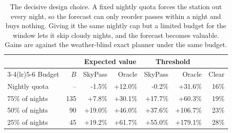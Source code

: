 \begin{table}[t]
\caption{The decisive design choice. A fixed nightly quota forces the station out every night, so the forecast can only reorder passes within a night and buys nothing. Giving it the same nightly cap but a limited budget for the window lets it skip cloudy nights, and the forecast becomes valuable. Gains are against the weather-blind exact planner under the same budget.}
\label{tab:budgetmodes}
\centering
\begin{tabular}{lrrrrrr}
\toprule
& & \multicolumn{2}{c}{Expected value} & \multicolumn{2}{c}{Threshold} & \\
\cmidrule(lr){3-4}\cmidrule(lr){5-6}
Budget & $B$ & SkyPass & Oracle & SkyPass & Oracle & Clear \\
\midrule
Nightly quota & -- & -1.5\% & +12.0\% & -0.2\% & +31.6\% & 16\% \\
75\% of nights & 135 & +7.8\% & +30.1\% & +17.7\% & +60.3\% & 19\% \\
50\% of nights & 90 & +19.0\% & +46.0\% & +37.6\% & +106.7\% & 23\% \\
25\% of nights & 45 & +19.2\% & +61.7\% & +55.0\% & +179.1\% & 28\% \\
\bottomrule
\end{tabular}
\end{table}
